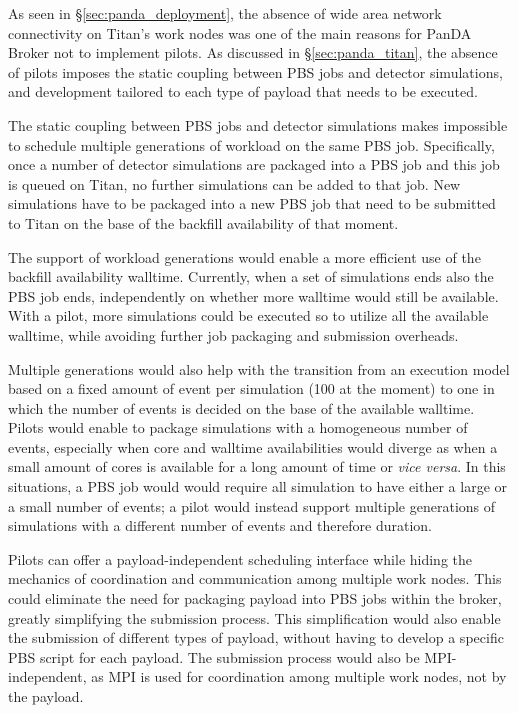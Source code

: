 As seen in \S\ref{sec:panda_deployment}, the absence of wide area network
connectivity on Titan's work nodes was one of the main reasons for PanDA Broker
not to implement pilots. As discussed in \S\ref{sec:panda_titan}, the absence of
pilots imposes the static coupling between PBS jobs and detector simulations,
and development tailored to each type of payload that needs to be executed.

The static coupling between PBS jobs and detector simulations makes impossible
to schedule multiple generations of workload on the same PBS job. Specifically,
once a number of detector simulations are packaged into a PBS job and this job
is queued on Titan, no further simulations can be added to that job. New
simulations have to be packaged into a new PBS job that need to be submitted to
Titan on the base of the backfill availability of that moment.

The support of workload generations would enable a more efficient use of the
backfill availability walltime. Currently, when a set of simulations ends also
the PBS job ends, independently on whether more walltime would still be
available. With a pilot, more simulations could be executed so to utilize all
the available walltime, while avoiding further job packaging and submission
overheads.

Multiple generations would also help with the transition from an execution model
based on a fixed amount of event per simulation (100 at the moment) to one in
which the number of events is decided on the base of the available walltime.
Pilots would enable to package simulations with a homogeneous number of events,
especially when core and walltime availabilities would diverge as when a small
amount of cores is available for a long amount of time or \textit{vice versa}.
In this situations, a PBS job would would require all simulation to have either
a large or a small number of events; a pilot would instead support multiple
generations of simulations with a different number of events and therefore
duration.

Pilots can offer a payload-independent scheduling interface while hiding the
mechanics of coordination and communication among multiple work nodes. This
could eliminate the need for packaging payload into PBS jobs within the broker,
greatly simplifying the submission process. This simplification would also
enable the submission of different types of payload, without having to develop a
specific PBS script for each payload. The submission process would also be
MPI-independent, as MPI is used for coordination among multiple work nodes, not
by the payload.

